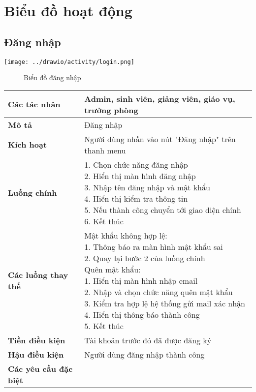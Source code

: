 \section{Biểu đồ hoạt động}
\subsection{Đăng nhập}
\begin{center}
	\texttt{[image: ../drawio/activity/login.png]}
	\begin{figure}[h]
		\centering
		\caption{Biểu đồ đăng nhập}
	\end{figure}
\end{center}
\begin{tabular}{|l|l|}
	\hline
	\textbf{Các tác nhân}         & Admin, sinh viên, giảng viên, giáo vụ, trưởng phòng \\
	\hline
	\textbf{Mô tả}                & Đăng nhập                                           \\
	\hline
	\textbf{Kích hoạt}            & Người dùng nhấn vào nút "Đăng nhập" trên thanh menu \\
	\hline
	\textbf{Luồng chính}          & \makecell[l]{1. Chọn chức năng đăng nhập            \\ 2. Hiển thị màn hình đăng nhập \\ 3. Nhập tên đăng nhập và mật khẩu \\ 4. Hiển thị kiểm tra thông tin \\ 5. Nếu thành công chuyển tới giao diện chính \\ 6. Kết thúc} \\
	\hline
	\textbf{Các luồng thay thế}   & \makecell[l]{Mật khẩu không hợp lệ:                 \\ 1. Thông báo ra màn hình mật khẩu sai \\ 2. Quay lại bước 2 của luồng chính \\ Quên mật khẩu: \\ 1. Hiển thị màn hình nhập email \\ 2. Nhập và chọn chức năng quên mật khẩu \\ 3. Kiểm tra hợp lệ hệ thống gửi mail xác nhận \\ 4. Hiển thị thông báo thành công \\ 5. Kết thúc} \\
	\hline
	\textbf{Tiền điều kiện}       & Tài khoản trước đó đã được đăng ký                  \\
	\hline
	\textbf{Hậu điều kiện}        & Người dùng đăng nhập thành công                     \\
	\hline
	\textbf{Các yêu cầu đặc biệt} &                                                     \\
	\hline
\end{tabular}

